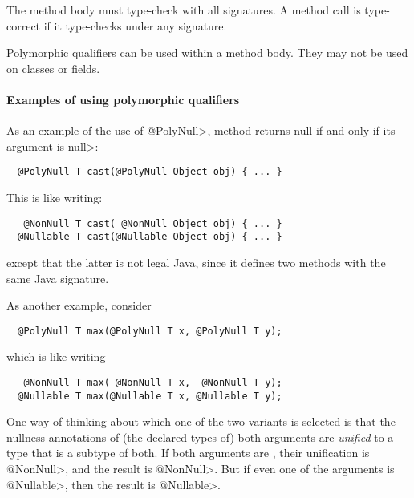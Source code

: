 The method body must type-check with all signatures.  A method call is
type-correct if it type-checks under any signature.

Polymorphic qualifiers can be used within a method body.  They may not be
used on classes or fields.


\paragraph{Examples of using polymorphic qualifiers\label{qualifier-polymorphism-examples}}

As an example of the use of \<@PolyNull>, method 
returns null if and only if its argument is \<null>:

\begin{Verbatim}
  @PolyNull T cast(@PolyNull Object obj) { ... }
\end{Verbatim}

\noindent
This is like writing:

\begin{Verbatim}
   @NonNull T cast( @NonNull Object obj) { ... }
  @Nullable T cast(@Nullable Object obj) { ... }
\end{Verbatim}

\noindent
except that the latter is not legal Java, since it defines two
methods with the same Java signature.


As another example, consider

\begin{Verbatim}
  @PolyNull T max(@PolyNull T x, @PolyNull T y);
\end{Verbatim}

\noindent
which is like writing

\begin{Verbatim}
   @NonNull T max( @NonNull T x,  @NonNull T y);
  @Nullable T max(@Nullable T x, @Nullable T y);
\end{Verbatim}

\noindent
One way of thinking about which one of the two  variants is
selected is that the nullness annotations of (the declared types of) both
arguments are \emph{unified} to a type that is a subtype of both.  If both
arguments are , their unification is \<@NonNull>, and the
result is \<@NonNull>.  But if even one of the arguments is \<@Nullable>,
then the result is \<@Nullable>.



